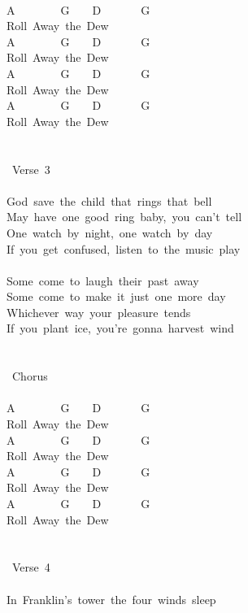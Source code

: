 {\\
A\ \ \ \ \ \ \ \ G\ \ \ \ D\ \ \ \ \ \ \ G\\
Roll\ Away\ the\ Dew\\
A\ \ \ \ \ \ \ \ G\ \ \ \ D\ \ \ \ \ \ \ G\\
Roll\ Away\ the\ Dew\\
A\ \ \ \ \ \ \ \ G\ \ \ \ D\ \ \ \ \ \ \ G\\
Roll\ Away\ the\ Dew\\
A\ \ \ \ \ \ \ \ G\ \ \ \ D\ \ \ \ \ \ \ G\\
Roll\ Away\ the\ Dew\\
\\
\\
\lbrack\ Verse\ 3\rbrack\\
\\
God\ save\ the\ child\ that\ rings\ that\ bell\\
May\ have\ one\ good\ ring\ baby,\ you\ can't\ tell\\
One\ watch\ by\ night,\ one\ watch\ by\ day\\
If\ you\ get\ confused,\ listen\ to\ the\ music\ play\\
\\
Some\ come\ to\ laugh\ their\ past\ away\\
Some\ come\ to\ make\ it\ just\ one\ more\ day\\
Whichever\ way\ your\ pleasure\ tends\\
If\ you\ plant\ ice,\ you're\ gonna\ harvest\ wind\\
\\
\\
\lbrack\ Chorus\rbrack\\
\\
A\ \ \ \ \ \ \ \ G\ \ \ \ D\ \ \ \ \ \ \ G\\
Roll\ Away\ the\ Dew\\
A\ \ \ \ \ \ \ \ G\ \ \ \ D\ \ \ \ \ \ \ G\\
Roll\ Away\ the\ Dew\\
A\ \ \ \ \ \ \ \ G\ \ \ \ D\ \ \ \ \ \ \ G\\
Roll\ Away\ the\ Dew\\
A\ \ \ \ \ \ \ \ G\ \ \ \ D\ \ \ \ \ \ \ G\\
Roll\ Away\ the\ Dew\\
\\
\\
\lbrack\ Verse\ 4\rbrack\\
\\
In\ Franklin's\ tower\ the\ four\ winds\ sleep\\
}
